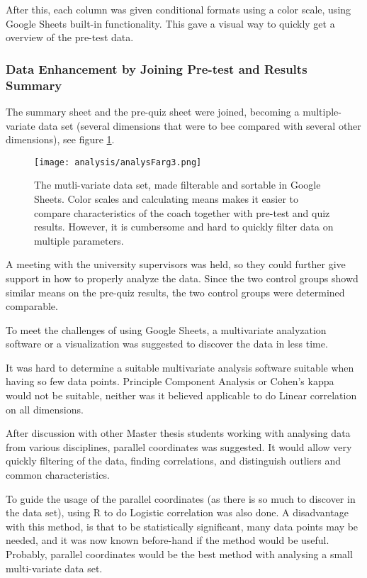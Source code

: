 After this, each column was given conditional formats using a color scale, using Google Sheets built-in functionality. This gave a visual way to quickly get a overview of the pre-test data.

\subsubsection{Data Enhancement by Joining Pre-test and Results Summary}

The summary sheet and the pre-quiz sheet were joined, becoming a multiple-variate data set (several dimensions that were to bee compared with several other dimensions), see figure \ref{fig:analysFarg3}.

\begin{figure}[h]
    \centering
    \texttt{[image: analysis/analysFarg3.png]}
    \caption{The mutli-variate data set, made filterable and sortable in Google Sheets. Color scales and calculating means makes it easier to compare characteristics of the coach together with pre-test and quiz results. However, it is cumbersome and hard to quickly filter data on multiple parameters.}
    \label{fig:analysFarg3}
\end{figure}

A meeting with the university supervisors was held, so they could further give support in how to properly analyze the data. Since the two control groups showd similar means on the pre-quiz results, the two control groups were determined comparable.

To meet the challenges of using Google Sheets, a multivariate analyzation software or a visualization was suggested to discover the data in less time.

It was hard to determine a suitable multivariate analysis software suitable when having so few data points. Principle Component Analysis or Cohen's kappa would not be suitable, neither was it believed applicable to do Linear correlation on all dimensions.

After discussion with other Master thesis students working with analysing data from various disciplines, parallel coordinates was suggested. It would allow very quickly filtering of the data, finding correlations, and distinguish outliers and common characteristics.

To guide the usage of the parallel coordinates (as there is so much to discover in the data set), using R to do Logistic correlation was also done. A disadvantage with this method, is that to be statistically significant, many data points may be needed, and it was now known before-hand if the method would be useful. Probably, parallel coordinates would be the best method with analysing a small multi-variate data set.

